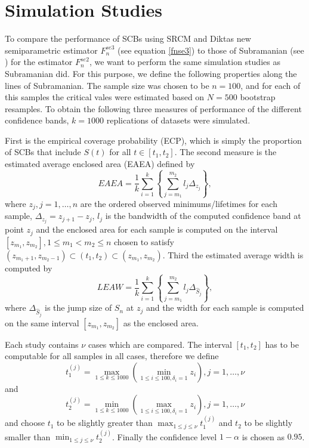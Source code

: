 \chapter{Simulation Studies}

To compare the performance of SCBs using SRCM and Diktas new semiparametric estimator  $F_n^{se3}$ (see equation \ref{fnse3}) to those of Subramanian (see \cite{PAPER5}) for the estimator $F_n^{se2}$, we want to perform the same simulation studies as Subramanian did. For this purpose, we define the following properties along the lines of Subramanian.
The sample size was chosen to be $n=100$, and for each of this samples the critical vales were estimated based on $N=500$ bootstrap resamples. To obtain the following three measures of performance of the different confidence bands, $k=1000$ replications of datasets were simulated.

First is the empirical coverage probability (ECP), which is simply the proportion of SCBs that include $S(t)$ for all $t \in [t_1,t_2]$. 
The second measure is the estimated average enclosed area (EAEA) defined by
\[
EAEA = \frac{1}{k} \sum_{i=1}^k \left\{ \sum_{j=m_1}^{m_2} l_j\Delta_{z_j}\right\},
\]
where $z_j, j=1,\ldots,n$ are the ordered observed minimums/lifetimes for each sample,
$\Delta_{z_j} = z_{j+1}-z_j$, $l_j$ is the bandwidth of the computed confidence band at point $z_j$ 
and the enclosed area for each sample is computed on the interval $[z_{m_1},z_{m_2}], 1 \leq m_1 < m_2 \leq n$ chosen to satisfy $(z_{m_1+1},z_{m_2-1}) \subset (t_1,t_2) \subset (z_{m_1},z_{m_2})$.
Third the estimated average width is computed by
\[L
EAW = \frac{1}{k} \sum_{i=1}^k \left\{ \sum_{j=m_1}^{m_2} l_j\Delta_{\hat{S}_j}\right\},
\]
where $\Delta_{\hat{S}_j}$ is the jump size of $S_n$ at $z_j$ and the width for each sample is computed on the same interval $[z_{m_1},z_{m_2}]$ as the enclosed area.

Each study contains $\nu$ cases which are compared. The interval $[t_1,t_2]$ has to be computable for all samples in all cases, therefore we define
\[
t_1^{(j)} = \max_{1\leq k \leq 1000} \left( \min_{1\leq i \leq 100,\delta_i=1} z_i \right), j = 1,\ldots,\nu 
\] 
and
\[
t_2^{(j)} = \min_{1\leq k \leq 1000} \left( \max_{1\leq i \leq 100,\delta_i=1} z_i \right), j = 1,\ldots,\nu 
\]
and choose $t_1$ to be slightly greater than $\max_{1\leq j \leq \nu}t_1^{(j)}$ and $t_2$ to be slightly smaller than  $\min_{1\leq j \leq \nu}t_2^{(j)}$.
Finally the confidence level $1-\alpha$ is chosen as $0.95$.

